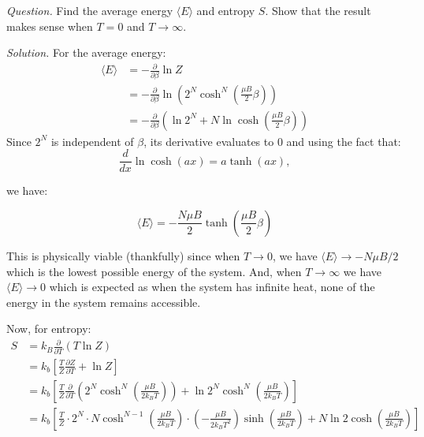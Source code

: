 \documentclass[11pt]{article}
\begin{document}
\textit{Question.} Find the average energy $\langle E\rangle$ and entropy $S$. Show that the result makes sense when $T=0$ and $T \to \infty$.

\textit{Solution.} For the average energy:
\begin{equation}
    \begin{aligned}
        \langle E\rangle &= - \frac{\partial }{\partial \beta} \ln Z \\
        &= - \frac{\partial}{\partial \beta} \ln \left(2^N \cosh^N \left(\frac{\mu B}{2}\beta \right)\right) \\
        &= -\frac{\partial}{\partial \beta} \left(\ln 2^N + N \ln \cosh \left(\frac{\mu B}{2} \beta\right) \right)
    \end{aligned}
\end{equation}
Since $2^N$ is independent of $\beta$, its derivative evaluates to 0 and using the fact that:
\begin{equation}
    \frac{d}{dx} \ln \cosh(ax) = a \tanh(ax),
\end{equation}

we have:

\begin{equation}
    \langle E \rangle = -\frac{N \mu B}{2}\tanh\left(\frac{\mu B}{2}\beta\right)
\end{equation}

This is physically viable (thankfully) since when $T\to 0$, we have $\langle E \rangle \to - N\mu B/2$ which is the lowest possible energy of the system. And, when $T \to \infty$ we have $\langle E\rangle \to 0$ which is expected as when the system has infinite heat, none of the energy in the system remains accessible.

Now, for entropy:
\begin{equation}
    \begin{aligned}
        S &= k_B\frac{\partial}{\partial T}(T \ln Z) \\
        &= k_b \left[\frac{T}{Z} \frac{\partial Z}{\partial T} + \ln Z\right] \\
        &= k_b\left[\frac{T}{Z}\frac{\partial }{\partial T} \left(2^N \cosh^N \left(\frac{\mu B}{2 k_BT}\right)\right)+ \ln  2^N \cosh^N \left(\frac{\mu B}{2 k_BT}\right)\right] \\
        &= k_b\left[\frac{T}{Z} \cdot 2^N \cdot N \cosh^{N-1} \left(\frac{\mu B}{2 k_BT}\right) \cdot \left(-\frac{\mu B}{2 k_BT^2}\right) \sinh\left(\frac{\mu B}{2 k_BT}\right) + N \ln 2 \cosh \left(\frac{\mu B}{2 k_BT}\right) \right]
    \end{aligned}
\end{equation}
\end{document}
